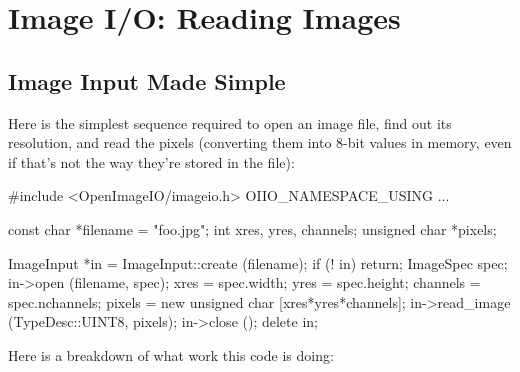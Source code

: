 \chapter{Image I/O: Reading Images}
\label{chap:imageinput}


\section{Image Input Made Simple}
\label{sec:imageinput:simple}

Here is the simplest sequence required to open an image file, find
out its resolution, and read the pixels (converting them into
8-bit values in memory, even if that's not the way they're stored in the file):

\begin{code}
        #include <OpenImageIO/imageio.h>
        OIIO_NAMESPACE_USING
        ...

        const char *filename = "foo.jpg";
        int xres, yres, channels;
        unsigned char *pixels;

        ImageInput *in = ImageInput::create (filename);
        if (! in)
            return;
        ImageSpec spec;
        in->open (filename, spec);
        xres = spec.width;
        yres = spec.height;
        channels = spec.nchannels;
        pixels = new unsigned char [xres*yres*channels];
        in->read_image (TypeDesc::UINT8, pixels);
        in->close ();
        delete in;
\end{code}

\noindent Here is a breakdown of what work this code is doing:


